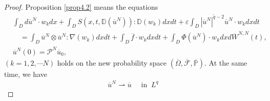 \documentclass[reqno]{amsart}
\theoremstyle{definition}
\theoremstyle{remark}
\numberwithin{equation}{section} \allowdisplaybreaks
\begin{document}
\begin{proof}
Proposition \ref{prop4.2} means the equations
\begin{equation}\label{4.28}
\begin{split}
&\int_{D}d\overline{u}^N\cdot
w_kdx+\int_{D}S(x,t,\mathbb{D}(\overline{u}^N)):\mathbb{D}(w_k)dxdt+\varepsilon\int_{D}|\overline{u}^N|^{\tilde{q}-2}\overline{u}^N\cdot
w_k dxdt\\&\quad=\int_{D}\overline{u}^N\otimes \overline{u}^N
:\nabla(w_k)dxdt
+\int_{D}\overline{f}\cdot w_k  dxdt+\int_{D}\Phi(\overline{u}^N)\cdot w_k dxd\overline{W}^{N,N}(t),\\
&\overline{u}^N(0)=\mathcal{P}^N\overline{u}_0,
\end{split}
\end{equation}
$(k=1,2,\cdots N)$ holds on the new probability space
$(\overline{\Omega},\overline{\mathscr{F}},\overline{\mathbb{P}})$.
At the same time, we have
\begin{align}\label{4.29}
\overline{u}^N\rightharpoonup \overline{u}& ~\mbox{ in }~   L^q

\end{align}
\end{proof}
\end{document}
